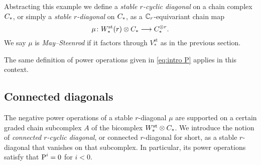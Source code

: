 Abstracting this example we define a \emph{stable $r$-cyclic diagonal} on a chain complex $C_{*}$, or simply a \textit{stable $r$-diagonal} on $C_{*}$, as a $\mathbb{C}_r$-equivariant chain map
\[
\mu \colon W^{\mathrm{st}}_{*}(r) \otimes C_{*} \longrightarrow C_{*}^{\otimes r}.
\]
We say $\mu$ is \textit{May--Steenrod} if it factors through $V_*^\mathrm{st}$ as in the previous section.

The same definition of power operations given in \cref{eq:intro P} applies in this context. 



\subsection{Connected diagonals}

The negative power operations of a stable $r$-diagonal $\mu$ are supported on a certain graded chain subcomplex $A$ of the bicomplex $W^{\mathrm{st}}_{*}\otimes C_{*}$. We introduce the notion of \emph{connected $r$-cyclic diagonal}, or connected $r$-diagonal for short, as a stable $r$-diagonal that vanishes on that subcomplex. In particular, its power operations satisfy that $\operatorname{P}^i = 0$ for $i<0$.

